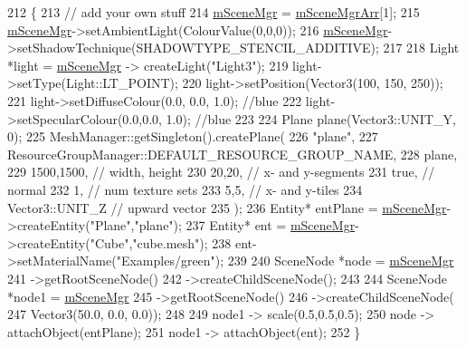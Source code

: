 \begin{DoxyCode}
212 \{
213     \textcolor{comment}{// add your own stuff}
214     \hyperlink{class_base_application_a8a7684f4f9a57ed3089048ad1a913b2d}{mSceneMgr} = \hyperlink{class_basic_tutorial__00_a603779b6087698c57b7989e16d8a9b93}{mSceneMgrArr}[1];
215     \hyperlink{class_base_application_a8a7684f4f9a57ed3089048ad1a913b2d}{mSceneMgr}->setAmbientLight(ColourValue(0,0,0));
216     \hyperlink{class_base_application_a8a7684f4f9a57ed3089048ad1a913b2d}{mSceneMgr}->setShadowTechnique(SHADOWTYPE\_STENCIL\_ADDITIVE);
217 
218     Light *light = \hyperlink{class_base_application_a8a7684f4f9a57ed3089048ad1a913b2d}{mSceneMgr} -> createLight(\textcolor{stringliteral}{"Light3"});
219     light->setType(Light::LT\_POINT);
220     light->setPosition(Vector3(100, 150, 250));
221     light->setDiffuseColour(0.0, 0.0, 1.0); \textcolor{comment}{//blue}
222     light->setSpecularColour(0.0,0.0, 1.0); \textcolor{comment}{//blue}
223 
224     Plane plane(Vector3::UNIT\_Y, 0);
225     MeshManager::getSingleton().createPlane(
226         \textcolor{stringliteral}{"plane"},
227         ResourceGroupManager::DEFAULT\_RESOURCE\_GROUP\_NAME,
228         plane,
229         1500,1500, \textcolor{comment}{// width, height}
230         20,20, \textcolor{comment}{// x- and y-segments}
231         \textcolor{keyword}{true}, \textcolor{comment}{// normal}
232         1, \textcolor{comment}{// num texture sets}
233         5,5, \textcolor{comment}{// x- and y-tiles}
234         Vector3::UNIT\_Z \textcolor{comment}{// upward vector}
235     ); 
236     Entity* entPlane = \hyperlink{class_base_application_a8a7684f4f9a57ed3089048ad1a913b2d}{mSceneMgr}->createEntity(\textcolor{stringliteral}{"Plane"},\textcolor{stringliteral}{"plane"});
237     Entity* ent = \hyperlink{class_base_application_a8a7684f4f9a57ed3089048ad1a913b2d}{mSceneMgr}->createEntity(\textcolor{stringliteral}{"Cube"},\textcolor{stringliteral}{"cube.mesh"});
238     ent->setMaterialName(\textcolor{stringliteral}{"Examples/green"});
239 
240     SceneNode *node = \hyperlink{class_base_application_a8a7684f4f9a57ed3089048ad1a913b2d}{mSceneMgr}
241         ->getRootSceneNode()
242         ->createChildSceneNode();
243 
244     SceneNode *node1 = \hyperlink{class_base_application_a8a7684f4f9a57ed3089048ad1a913b2d}{mSceneMgr}
245         ->getRootSceneNode()
246         ->createChildSceneNode(
247             Vector3(50.0, 0.0, 0.0));
248 
249     node1 -> scale(0.5,0.5,0.5);
250     node -> attachObject(entPlane);
251     node1 -> attachObject(ent);
252 \}
\end{DoxyCode}
\mbox{\label{class_basic_tutorial__00_a6d4684502f2f7b2cf628a975d7750d8e}} 
